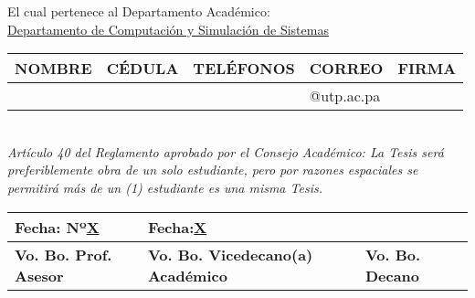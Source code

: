 El cual pertenece al Departamento Académico:\\
\underline{Departamento de Computación y Simulación de Sistemas}

\begin{tabularx}{\textwidth}{
  | >{\raggedright\arraybackslash}X
  | >{\raggedright\arraybackslash}X
  | >{\raggedright\arraybackslash}X
  | >{\raggedright\arraybackslash}X
  | >{\raggedright\arraybackslash}X |}
  \hline
  \textbf{NOMBRE} & \textbf{CÉDULA} & \textbf{TELÉFONOS} & \textbf{CORREO} & \textbf{FIRMA} \\
  \hline
  & & & @utp.ac.pa & \\
  \hline
\end{tabularx}
\\
\itshape \small
Artículo 40 del Reglamento aprobado por el Consejo Académico: La Tesis será preferiblemente obra de un solo estudiante, pero por razones espaciales se permitirá más de un (1) estudiante es una misma Tesis.
\upshape \normalsize

\begin{tabularx}{\textwidth}{|s|b|t|}
  \hline
  Fecha: Nº\underline{X} & Fecha:\underline{X} & \\
  \hline
  \textbf{Vo. Bo. Prof. Asesor} & \textbf{Vo. Bo. Vicedecano(a) Académico} & \textbf{Vo. Bo. Decano} \\
  \hline
\end{tabularx}
